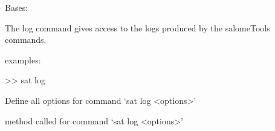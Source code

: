 \documentclass[a4paper,10pt,english]{sphinxmanual}
\begin{document}
\begin{fulllineitems}
\label{\detokenize{apidoc_commands/commands:commands.log.Command}}
Bases: 

The log command gives access to the logs produced by the salomeTools commands.

\begin{DUlineblock}{0em}
\item[] examples:
\item[] \textgreater{}\textgreater{} sat log
\end{DUlineblock}

\begin{fulllineitems}
\label{\detokenize{apidoc_commands/commands:commands.log.Command.getParser}}
Define all options for command ‘sat log \textless{}options\textgreater{}’

\end{fulllineitems}


\begin{fulllineitems}
\label{\detokenize{apidoc_commands/commands:commands.log.Command.name}}
\end{fulllineitems}


\begin{fulllineitems}
\label{\detokenize{apidoc_commands/commands:commands.log.Command.run}}
method called for command ‘sat log \textless{}options\textgreater{}’

\end{fulllineitems}


\end{fulllineitems}

\end{document}
